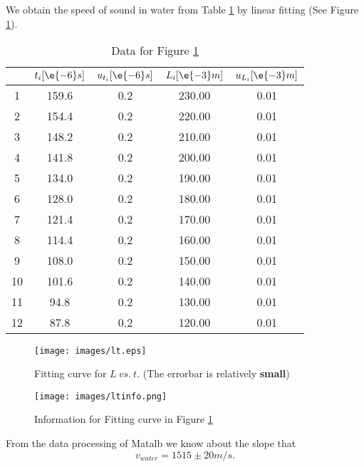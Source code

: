 We obtain the speed of sound in water from Table \ref{data_tim} by linear fitting (See Figure \ref{lt}).
    
\begin{table}[H] \small
    \centering
    \begin{tabular}{|c|c|c|c|c|}
    \hline
        & $t_i[\e{-6}s]$ & $u_{t_i}[\e{-6}s]$ & $L_i[\e{-3}m]$ & $u_{L_i}[\e{-3}m]$\\\hline
        1 & 159.6 & 0.2 & 230.00 & 0.01\\\hline
        2 & 154.4 & 0.2 & 220.00 & 0.01\\\hline
        3 & 148.2 & 0.2 & 210.00 & 0.01\\\hline
        4 & 141.8 & 0.2 & 200.00 & 0.01\\\hline
        5 & 134.0 & 0.2 & 190.00 & 0.01\\\hline
        6 & 128.0 & 0.2 & 180.00 & 0.01\\\hline
        7 & 121.4 & 0.2 & 170.00 & 0.01\\\hline
        8 & 114.4 & 0.2 & 160.00 & 0.01\\\hline
        9 & 108.0 & 0.2 & 150.00 & 0.01\\\hline
        10 & 101.6 & 0.2 & 140.00 & 0.01\\\hline
        11 & 94.8 & 0.2 & 130.00 & 0.01\\\hline
        12 & 87.8 & 0.2 & 120.00 & 0.01\\\hline
    \end{tabular}
    \caption{Data for Figure \ref{lt}}\label{data_tim}
\end{table}
\begin{figure}[H]
    \centering
    \texttt{[image: images/lt.eps]}
    \caption{Fitting curve for $L\ vs.\ t$. (The errorbar is relatively \textbf{small})}\label{lt}
\end{figure}
\begin{figure}[H]
    \centering
    \texttt{[image: images/ltinfo.png]}
    \caption{Information for Fitting curve in Figure \ref{lt}}\label{ltinfo}
\end{figure}

From the data processing of Matalb we know about the slope that 
\[
    v_{water}=1515\pm20m/s.
\]